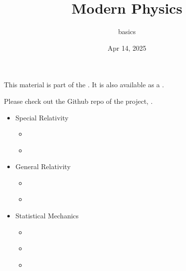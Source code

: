 \documentclass[letterpaper,10pt,english]{jupyterBook}
\title{Modern Physics}
\date{Apr 14, 2025}
\author{basics}
\begin{document}
\pagestyle{empty}
\sphinxmaketitle
\pagestyle{plain}
\sphinxtableofcontents
\pagestyle{normal}
\label{\detokenize{intro::doc}}


\sphinxAtStartPar
This material is part of the . It is also available as a .

\sphinxAtStartPar
Please check out the Github repo of the project, .
\begin{itemize}
\item {} 
\sphinxAtStartPar
Special Relativity

\begin{itemize}
\item {} 
\sphinxAtStartPar
{\hyperref[\detokenize{ch/relativity-special/intro::doc}]{}}

\item {} 
\sphinxAtStartPar
{\hyperref[\detokenize{ch/relativity-special/notes::doc}]{}}

\end{itemize}
\end{itemize}
\begin{itemize}
\item {} 
\sphinxAtStartPar
General Relativity

\begin{itemize}
\item {} 
\sphinxAtStartPar
{\hyperref[\detokenize{ch/relativity-general/intro::doc}]{}}

\item {} 
\sphinxAtStartPar
{\hyperref[\detokenize{ch/relativity-general/notes::doc}]{}}

\end{itemize}
\end{itemize}
\begin{itemize}
\item {} 
\sphinxAtStartPar
Statistical Mechanics

\begin{itemize}
\item {} 
\sphinxAtStartPar
{\hyperref[\detokenize{ch/statistical-mechanics/intro::doc}]{}}

\item {} 
\sphinxAtStartPar
{\hyperref[\detokenize{ch/statistical-mechanics/notes::doc}]{}}

\item {} 
\sphinxAtStartPar
{\hyperref[\detokenize{ch/statistical-mechanics/statistics::doc}]{}}

\end{itemize}
\end{itemize}
\end{document}
